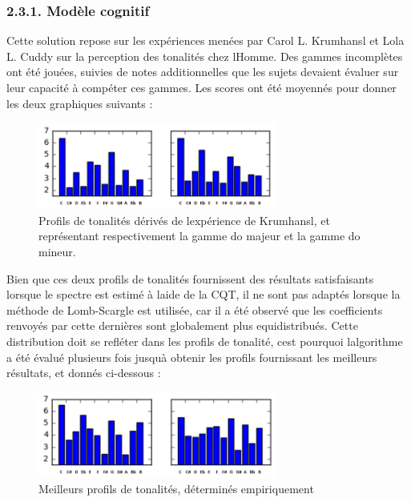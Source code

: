\documentclass[letterpaper]{article}
\begin{document}
\subsubsection*{2.3.1. Modèle cognitif}

Cette solution repose sur les expériences menées par Carol L. Krumhansl et Lola L. Cuddy sur la perception des tonalités chez l\textquotesingle Homme.
Des gammes incomplètes ont été jouées, suivies de notes additionnelles que les sujets devaient évaluer sur leur capacité à compéter ces gammes. 
Les scores ont été moyennés pour donner les deux graphiques suivants :

\FloatBarrier

\begin{figure}[h!]
\begin{center}
\includegraphics[width=3.1in,angle=0]{imgs/Krumhansl.png}
\caption{Profils de tonalités dérivés de l\textquotesingle expérience de Krumhansl, et représentant respectivement la gamme do majeur
et la gamme do mineur.}
\label{fig1}
\end{center}
\end{figure}

Bien que ces deux profils de tonalités fournissent des résultats satisfaisants lorsque le spectre est estimé à l\textquotesingle aide de la CQT, il ne sont pas adaptés lorsque la méthode de Lomb-Scargle est utilisée, car il a été observé que les coefficients renvoyés par cette dernières sont globalement plus equidistribués. Cette distribution doit se refléter dans les profils de tonalité, c\textquotesingle est pourquoi l\textquotesingle algorithme a été évalué plusieurs fois jusqu\textquotesingle à obtenir les profils fournissant les meilleurs résultats, et donnés ci-dessous :

\begin{figure}[h!]
\begin{center}
\includegraphics[width=3.1in,angle=0]{imgs/Custom.png}
\caption{Meilleurs profils de tonalités, déterminés empiriquement}
\label{fig1}
\end{center}
\end{figure}
\end{document}
